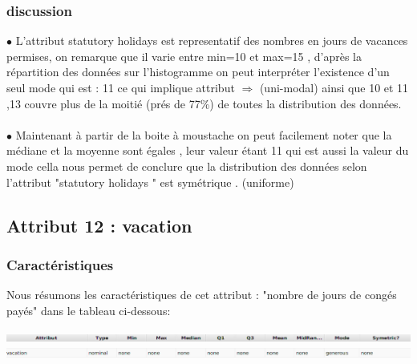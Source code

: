 \documentclass[12pt,a4paper,oneside]{book}
\begin{document}
	\subsubsection*{discussion}
	
	
	$\bullet$ L'attribut statutory holidays est representatif des nombres en jours de vacances permises, on remarque que il varie entre min=10 et max=15 , d'après la répartition des données sur l'histogramme on peut interpréter l'existence d'un seul mode qui est : 11 ce qui implique attribut $\Rightarrow$ (uni-modal) ainsi que 10 et 11 ,13 couvre plus de la moitié (prés de 77\%) de toutes la distribution des données.\\
	\textbf{ }\\
	$\bullet$ Maintenant à partir de la boite à moustache on peut facilement noter que la médiane et la moyenne sont égales , leur valeur étant 11 qui est aussi la valeur du mode cella nous permet de conclure que la distribution des données selon l'attribut "statutory holidays " est symétrique . (uniforme) 
	
	\newpage
	
	\subsection{Attribut 12 : vacation}
	\subsubsection{Caractéristiques}
	Nous résumons les caractéristiques de cet attribut : "nombre de jours de congés payés" dans le tableau ci-dessous:
	\begin{center}
		\includegraphics[width=1\textwidth]{screens/att.png}\\ \includegraphics[width=1\textwidth]{screens/att-13.png}%
		\label{labelname}%
	\end{center}
	
\end{document}
